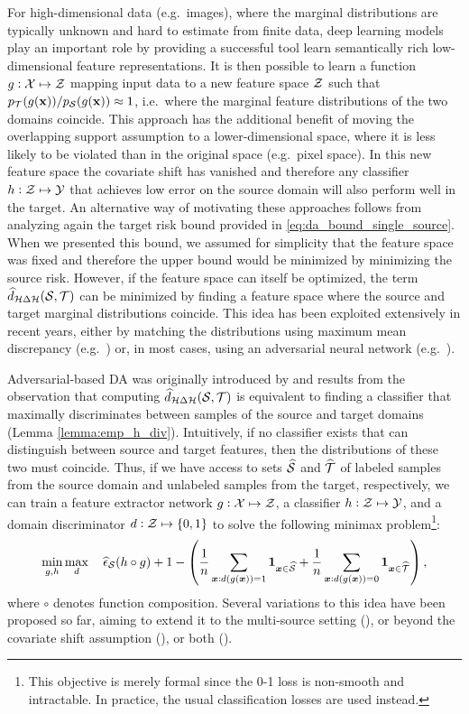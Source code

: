 For high-dimensional data (e.g.\ images), where the marginal distributions are typically unknown and hard to estimate from finite data, deep learning models play an important role by providing a successful tool learn semantically rich low-dimensional feature representations. It is then possible to learn a function $g:{\mathcal{X}} \mapsto {\mathcal{Z}}$ mapping input data to a new feature space ${\mathcal{Z}}$ such that $p_{{\mathcal{T}}}(g({\mathbf{x}}))/p_{{\mathcal{S}}}(g({\mathbf{x}})) \approx 1$, i.e.\ where the marginal feature distributions of the two domains coincide. This approach has the additional benefit of moving the overlapping support assumption to a lower-dimensional space, where it is less likely to be violated than in the original space (e.g.\ pixel space). In this new feature space the covariate shift has vanished and therefore any classifier $h:{\mathcal{Z}} \mapsto {\mathcal{Y}}$ that achieves low error on the source domain will also perform well in the target. An alternative way of motivating these approaches follows from analyzing again the target risk bound provided in \eqref{eq:da_bound_single_source}. When we presented this bound, we assumed for simplicity that the feature space was fixed and therefore the upper bound would be minimized by minimizing the source risk. However, if the feature space can itself be optimized, the term $\widehat{d}_{{\mathcal{H}} \Delta {\mathcal{H}}}({\mathcal{S}}, {\mathcal{T}})$ can be minimized by finding a feature space where the source and target marginal distributions coincide. This idea has been exploited extensively in recent years, either by matching the distributions using maximum mean discrepancy (e.g.\ \citet{Long2015,Guo2018}) or, in most cases, using an adversarial neural network (e.g.\ \citet{Zhao2018,Ganin2015,Pei2018,Sebag2019}).

Adversarial-based DA was originally introduced by \citet{Ganin2015} and results from the observation that 
computing $\widehat{d}_{{\mathcal{H}} \Delta {\mathcal{H}}}({\mathcal{S}}, {\mathcal{T}})$ is equivalent to finding a classifier that maximally discriminates between samples of the source and target domains (Lemma \ref{lemma:emp_h_div}). Intuitively, if no classifier exists that can distinguish between source and target features, then the distributions of these two must coincide. Thus, if we have access to sets $\widehat{{\mathcal{S}}}$ and $\widehat{{\mathcal{T}}}$ of labeled samples from the source domain and unlabeled samples from the target, respectively, we can train a feature extractor network $g:{\mathcal{X}} \mapsto {\mathcal{Z}}$, a classifier $h:{\mathcal{Z}} \mapsto {\mathcal{Y}}$, and a domain discriminator $d:{\mathcal{Z}} \mapsto \{0,1\}$ to solve the following minimax problem\footnote{This objective is merely formal since the 0-1 loss is non-smooth and intractable. In practice, the usual classification losses are used instead.}:
\begin{equation}
	\label{eq:dann_obj}
	\min_{g,h} \max_d \quad \widehat{\epsilon}_{\mathcal{S}}(h \circ g) + 1 - \left(\frac{1}{n} \sum_{{\bm{x}}: d(g({\bm{x}}))=1} \bm{1}_{{\bm{x}} \in \widehat{{\mathcal{S}}}} + \frac{1}{n} \sum_{{\bm{x}}: d(g({\bm{x}}))=0} \bm{1}_{{\bm{x}} \in \widehat{{\mathcal{T}}}}\right),
\end{equation}
where $\circ$ denotes function composition. Several variations to this idea have been proposed so far, aiming to extend it to the multi-source setting (\citet{Zhao2018}), or beyond the covariate shift assumption (\citet{Pei2018}), or both (\citet{Sebag2019}).

